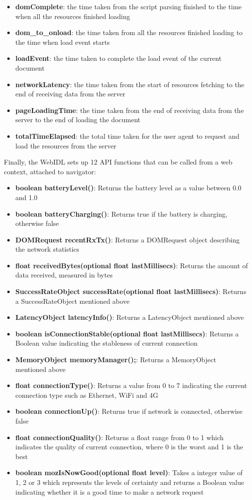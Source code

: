 \documentclass[12pt]{article}
\begin{document}
\begin{itemize}
  \item \textbf{domComplete}: the time taken from the script parsing finished to the time when all the resources finished loading
  \item \textbf{dom\_to\_onload}: the time taken from all the resources finished loading to the time when load event starts
  \item \textbf{loadEvent}: the time taken to complete the load event of the current document
  \item \textbf{networkLatency}: the time taken from the start of resources fetching to the end of receiving data from the server
  \item \textbf{pageLoadingTime}: the time taken from the end of receiving data from the server to the end of loading the document
  \item \textbf{totalTimeElapsed}: the total time taken for the user agent to request and load the resources from the server
\end{itemize}

Finally, the WebIDL sets up 12 API functions that can be called from a web context, attached to navigator:
\begin{itemize}
  \item \textbf{boolean batteryLevel()}: Returns the battery level as a value between 0.0 and 1.0
  \item \textbf{boolean batteryCharging()}: Returns true if the battery is charging, otherwise false
  \item \textbf{DOMRequest recentRxTx()}: Returns a DOMRequest object describing the network statistics
  \item \textbf{float receivedBytes(optional float lastMillisecs)}: Returns the amount of data received, measured in bytes
  \item \textbf{SuccessRateObject successRate(optional float lastMillisecs)}: Returns a SuccessRateObject mentioned above
  \item \textbf{LatencyObject latencyInfo()}: Returns a LatencyObject mentioned above
  \item \textbf{boolean isConnectionStable(optional float lastMillisecs)}: Returns a Boolean value indicating the stableness of current connection
  \item \textbf{MemoryObject memoryManager();}: Returns a MemoryObject mentioned above
  \item \textbf{float connectionType()}: Returns a value from 0 to 7 indicating the current connection type such as Ethernet, WiFi and 4G
  \item \textbf{boolean connectionUp()}: Returns true if network is connected, otherwise false
  \item \textbf{float connectionQuality()}: Returns a float range from 0 to 1 which indicates the quality of current connection, where 0 is the worst and 1 is the best
  \item \textbf{boolean mozIsNowGood(optional float level)}: Takes a integer value of 1, 2 or 3 which represents the levels of certainty and returns a Boolean value indicating whether it is a good time to make a network request
\end{itemize}
\end{document}
